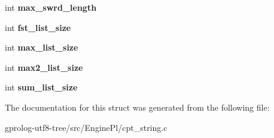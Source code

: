 \begin{DoxyCompactItemize}
\item 
int {\bfseries max\+\_\+swrd\+\_\+length}\hypertarget{structCPTStat_a05b16154f6a16eb86044c904c7db9de5}{}\label{structCPTStat_a05b16154f6a16eb86044c904c7db9de5}

\item 
int {\bfseries fst\+\_\+list\+\_\+size}\hypertarget{structCPTStat_aaec7403d2c937e97e1f323b4603d7a17}{}\label{structCPTStat_aaec7403d2c937e97e1f323b4603d7a17}

\item 
int {\bfseries max\+\_\+list\+\_\+size}\hypertarget{structCPTStat_a80e4787886e45e62cff7232be9f4cd7c}{}\label{structCPTStat_a80e4787886e45e62cff7232be9f4cd7c}

\item 
int {\bfseries max2\+\_\+list\+\_\+size}\hypertarget{structCPTStat_acac2689f27927c81da60a96191c99b30}{}\label{structCPTStat_acac2689f27927c81da60a96191c99b30}

\item 
int {\bfseries sum\+\_\+list\+\_\+size}\hypertarget{structCPTStat_ad99f1b443d4a863deb09e79760adf33f}{}\label{structCPTStat_ad99f1b443d4a863deb09e79760adf33f}

\end{DoxyCompactItemize}


The documentation for this struct was generated from the following file\+:\begin{DoxyCompactItemize}
\item 
gprolog-\/utf8-\/tree/src/\+Engine\+Pl/cpt\+\_\+string.\+c\end{DoxyCompactItemize}
